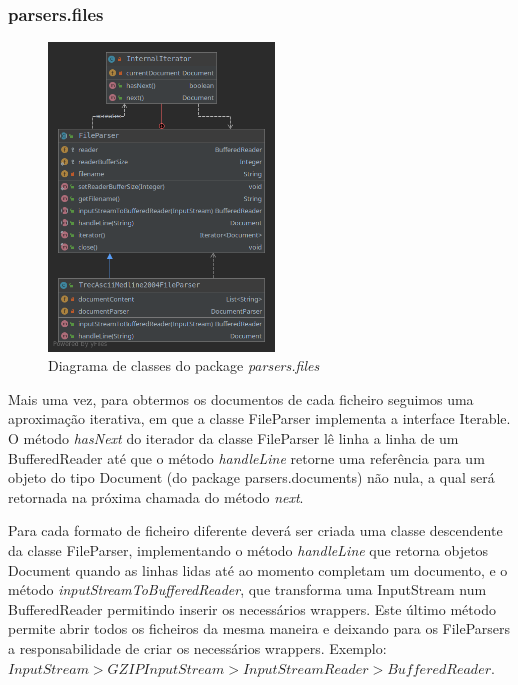 \documentclass[12pt]{article}
\begin{document}
\subsubsection{parsers.files}
\begin{figure}[h]
  \center
  \includegraphics[width=6cm]{packages_parsers_files.png}
  \caption{Diagrama de classes do package \it parsers.files}
\end{figure}

Mais uma vez, para obtermos os documentos de cada ficheiro seguimos uma aproximação
iterativa, em que a classe FileParser implementa a interface Iterable. O método
{\it hasNext} do iterador da classe FileParser lê linha a linha de um BufferedReader
até que o método {\it handleLine} retorne uma referência para um objeto do tipo Document
(do package parsers.documents) não nula, a qual será retornada na próxima chamada do
método {\it next}.

Para cada formato de ficheiro diferente deverá ser criada uma classe descendente da classe
FileParser, implementando o método {\it handleLine} que retorna objetos Document quando
as linhas lidas até ao momento completam um documento, e o método {\it inputStreamToBufferedReader},
que transforma uma InputStream num BufferedReader permitindo inserir os necessários wrappers.
Este último método permite abrir todos os ficheiros da mesma maneira e deixando para os FileParsers
a responsabilidade de criar os necessários wrappers. Exemplo: \(InputStream >
GZIPInputStream > InputStreamReader > BufferedReader\).
\end{document}
